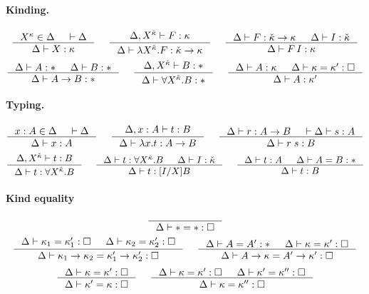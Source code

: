 \paragraph{Kinding.}
\[ \inference{X^\kappa\in\Delta & |- \Delta}
             {\Delta |- X : \kappa}
 ~~~~
   \inference{\Delta,X^\ka |- F : \kappa}
             {\Delta |- \lambda X^\ka.F : \ka->\kappa}
 ~~~~
   \inference{\Delta |- F : \ka->\kappa & \Delta |- I : \ka}
             {\Delta |- F\,I : \kappa}
\]
\[ \inference{\Delta |- A : * & \Delta |- B : *}{\Delta |- A -> B : * }
 ~~~~
   \inference{\Delta, X^\ka |- B : *}{\Delta |- \forall X^\ka . B : *}
 ~~~~
   \inference{\Delta |- A : \kappa & \Delta |- \kappa = \kappa' : \square}
             {\Delta |- A : \kappa'}
\]

\paragraph{Typing.}
\[ \inference{x:A \in \Delta & |- \Delta}{\Delta |- x:A}
 ~~~~
   \inference{\Delta, x:A |- t : B}{\Delta |- \lambda x.t : A-> B}
 ~~~~
   \inference{\Delta |- r : A-> B & |- \Delta |- s : A}{\Delta |- r\;s : B}
\]
\[ \inference{\Delta, X^\ka |- t : B}{\Delta |- t : \forall X^\ka.B}
 ~~~~
   \inference{\Delta |- t : \forall X^\ka.B & \Delta |- I:\ka}
             {\Delta |- t : [I/X]B}
 ~~~~
   \inference{\Delta |- t :A & \Delta |- A = B : *}{\Delta |- t : B}
\]

\paragraph{Kind equality}
\[ \inference{}{\Delta |- * = *:\square}
\]
\[
   \inference{ \Delta |- \kappa_1 = \kappa_1':\square
             & \Delta |- \kappa_2 = \kappa_2':\square}
             {\Delta |- \kappa_1-> \kappa_2 = \kappa_1'-> \kappa_2':\square}
 ~~~~
   \inference{\Delta |- A=A':* & \Delta |- \kappa=\kappa':\square}
             {\Delta |- A -> \kappa = A' -> \kappa' : \square}
\]
\[ \inference{\Delta |- \kappa=\kappa':\square}
             {\Delta |- \kappa'=\kappa:\square}
 ~~~~
   \inference{ \Delta |- \kappa =\kappa' :\square
             & \Delta |- \kappa'=\kappa'':\square}
             {\Delta |- \kappa=\kappa'':\square}
\]

